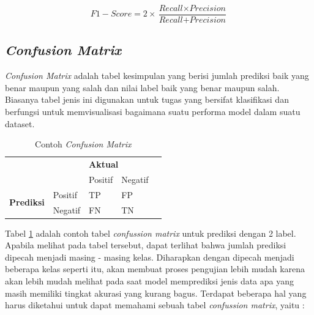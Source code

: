 \begin{equation}
    \label{form: f1-score}
    F1-Score = 2 \times \frac{\textit{Recall} \times \textit{Precision}}{\textit{Recall} + \textit{Precision}}
\end{equation}

\subsection{\textit{Confusion Matrix}}

\textit{Confusion Matrix} adalah tabel kesimpulan yang berisi jumlah prediksi baik yang benar maupun yang salah dan nilai label baik yang benar maupun salah. Biasanya tabel jenis ini digunakan untuk tugas yang bersifat klasifikasi dan berfungsi untuk memvisualisasi bagaimana suatu performa model dalam suatu dataset.

\begin{table}
    \caption{Contoh \textit{Confusion Matrix}}
    \label{tab:cth_confusion_mtrx}
    \centering
    \begin{tabular}{|l|l|l|l|l}
        \cline{1-4}
        \multicolumn{2}{|l|}{\multirow{2}{*}{}} & \multicolumn{2}{l|}{\textbf{Aktual}} &                \\ \cline{3-4}
        \multicolumn{2}{|l|}{}                  & Positif                              & Negatif &      \\ \cline{1-4}
        \multirow{2}{*}{\textbf{Prediksi}}      & Positif                              & TP      & FP & \\ \cline{2-4}
                                                & Negatif                              & FN      & TN & \\ \cline{1-4}
    \end{tabular}
\end{table}

Tabel \ref{tab:cth_confusion_mtrx} adalah contoh tabel \textit{confussion matrix} untuk prediksi dengan 2 label. Apabila melihat pada tabel tersebut, dapat terlihat bahwa jumlah prediksi dipecah menjadi masing - masing kelas. Diharapkan dengan dipecah menjadi beberapa kelas seperti itu, akan membuat proses pengujian lebih mudah karena akan lebih mudah melihat pada saat model memprediksi jenis data apa yang masih memiliki tingkat akurasi yang kurang bagus. Terdapat beberapa hal yang harus diketahui untuk dapat memahami sebuah tabel \textit{confussion matrix}, yaitu :

